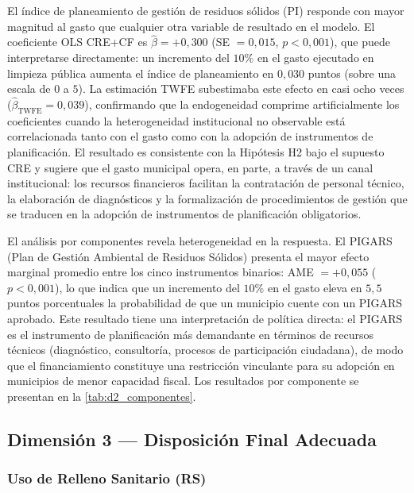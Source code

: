 El índice de planeamiento de gestión de residuos sólidos (PI) responde con mayor magnitud al gasto que cualquier otra variable de resultado en el modelo. El coeficiente OLS CRE+CF es $\hat{\beta} = +0{,}300$ (SE $= 0{,}015$, $p < 0{,}001$), que puede interpretarse directamente: un incremento del $10\%$ en el gasto ejecutado en limpieza pública aumenta el índice de planeamiento en $0{,}030$ puntos (sobre una escala de $0$ a $5$). La estimación TWFE subestimaba este efecto en casi ocho veces ($\hat{\beta}_{\text{TWFE}} = 0{,}039$), confirmando que la endogeneidad comprime artificialmente los coeficientes cuando la heterogeneidad institucional no observable está correlacionada tanto con el gasto como con la adopción de instrumentos de planificación. El resultado es consistente con la Hipótesis H2 bajo el supuesto CRE y sugiere que el gasto municipal opera, en parte, a través de un canal institucional: los recursos financieros facilitan la contratación de personal técnico, la elaboración de diagnósticos y la formalización de procedimientos de gestión que se traducen en la adopción de instrumentos de planificación obligatorios.

El análisis por componentes revela heterogeneidad en la respuesta. El PIGARS (Plan de Gestión Ambiental de Residuos Sólidos) presenta el mayor efecto marginal promedio entre los cinco instrumentos binarios: AME $= +0{,}055$ ($p < 0{,}001$), lo que indica que un incremento del $10\%$ en el gasto eleva en $5{,}5$ puntos porcentuales la probabilidad de que un municipio cuente con un PIGARS aprobado. Este resultado tiene una interpretación de política directa: el PIGARS es el instrumento de planificación más demandante en términos de recursos técnicos (diagnóstico, consultoría, procesos de participación ciudadana), de modo que el financiamiento constituye una restricción vinculante para su adopción en municipios de menor capacidad fiscal. Los resultados por componente se presentan en la \cref{tab:d2_componentes}.

\subsection{Dimensión 3 --- Disposición Final Adecuada}
\label{sec:d3}

\subsubsection*{Uso de Relleno Sanitario (RS)}

